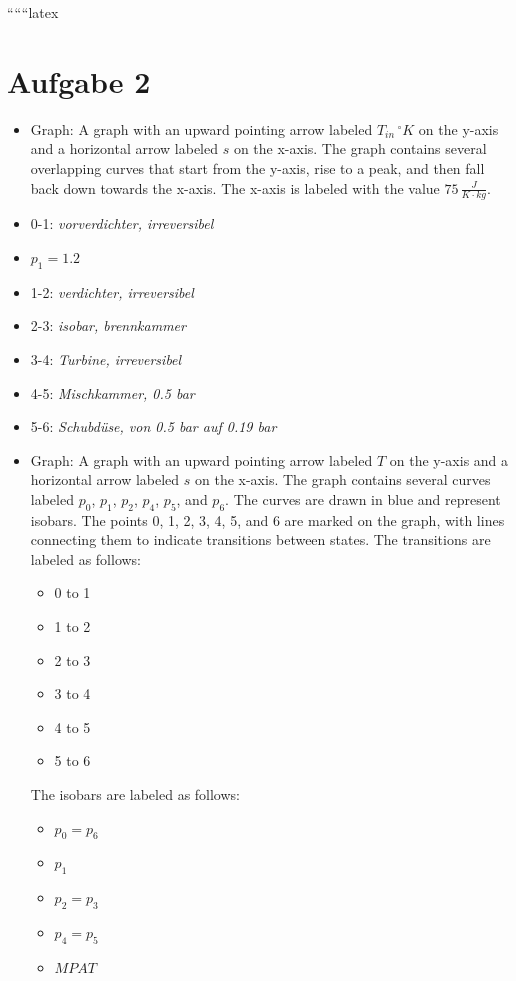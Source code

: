 
``````latex


\section*{Aufgabe 2}

\begin{itemize}
    \item Graph: A graph with an upward pointing arrow labeled $T_{in} \, ^\circ K$ on the y-axis and a horizontal arrow labeled $s$ on the x-axis. The graph contains several overlapping curves that start from the y-axis, rise to a peak, and then fall back down towards the x-axis. The x-axis is labeled with the value $75 \, \frac{J}{K \cdot kg}$.
\end{itemize}

\begin{itemize}
    \item 0-1: \textit{vorverdichter, irreversibel}
    \item $p_1 = 1.2$
    \item 1-2: \textit{verdichter, irreversibel}
    \item 2-3: \textit{isobar, brennkammer}
    \item 3-4: \textit{Turbine, irreversibel}
    \item 4-5: \textit{Mischkammer, 0.5 bar}
    \item 5-6: \textit{Schubdüse, von 0.5 bar auf 0.19 bar}
\end{itemize}

\begin{itemize}
    \item Graph: A graph with an upward pointing arrow labeled $T$ on the y-axis and a horizontal arrow labeled $s$ on the x-axis. The graph contains several curves labeled $p_0$, $p_1$, $p_2$, $p_4$, $p_5$, and $p_6$. The curves are drawn in blue and represent isobars. The points 0, 1, 2, 3, 4, 5, and 6 are marked on the graph, with lines connecting them to indicate transitions between states. The transitions are labeled as follows:
    \begin{itemize}
        \item 0 to 1
        \item 1 to 2
        \item 2 to 3
        \item 3 to 4
        \item 4 to 5
        \item 5 to 6
    \end{itemize}
    The isobars are labeled as follows:
    \begin{itemize}
        \item $p_0 = p_6$
        \item $p_1$
        \item $p_2 = p_3$
        \item $p_4 = p_5$
        \item $MPAT$
    \end{itemize}
\end{itemize}

